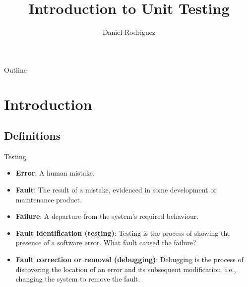 \documentclass[11pt, xcolor=svgnames]{beamer}
\title {Introduction to Unit Testing}
\author[Daniel Rodriguez]{
  \textcolor{green!50!black}{Daniel Rodriguez}%
}
\institute[UAH]{University of Alcala}
\date{}
\providecommand{\alert}[1]{\textbf{#1}}
\begin{document}
\maketitle

\begin{frame}[fragile]{Outline}
  \tableofcontents
\end{frame}

\AtBeginSection
{
\begin{frame}
  \tableofcontents[currentsection]
\end{frame}
}


\section{Introduction}


\subsection{Definitions}


\begin{frame}{Testing}

  \begin{itemize}
   \item \alert{Error}: A human mistake.
   \item \alert{Fault}: The result of a mistake, evidenced in some development or maintenance product.
   \item \alert{Failure}: A departure from the system's required behaviour.
  \end{itemize}
  
  \begin{itemize}
   \item \alert{Fault identification (testing)}: Testing is the process of showing the presence of a software error. What fault caused the failure?
   \item \alert{Fault correction or removal (debugging)}: Debugging is the process of discovering the location of an error and its subsequent modification, i.e., changing the system to remove the fault.
  \end{itemize}
  
  \end{frame}
\end{document}
